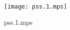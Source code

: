 \documentclass[letterpaper,10pt]{article}
\begin{document}
\begin{figure}
    \centering
    \texttt{[image: pss.1.mps]}
    \caption{pss.1.mps}
\end{figure}
\end{document}
